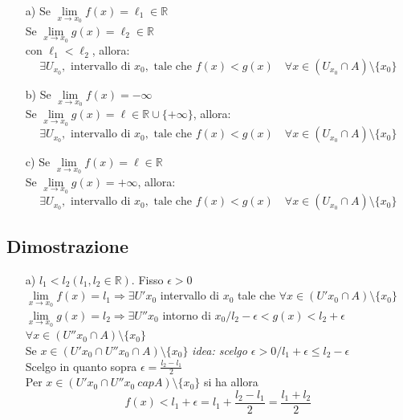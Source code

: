 \documentclass{article}
\newcommand{\R}{\mathbb{R}}
\newcommand{\vSpace}{\vspace{1em}}
\begin{document}
\begin{flushleft}
\begin{enumerate}
    \item[a)] Se \( \lim\limits_{x \to x_0} f(x) = \ell_1 \in \mathbb{R} \) \\
          Se \( \lim\limits_{x \to x_0} g(x) = \ell_2 \in \mathbb{R} \) \\
          con \( \ell_1 < \ell_2 \), allora:
          \[
          \exists U_{x_0}, \text{ intervallo di } x_0, \text{ tale che } f(x) < g(x) \quad \forall x \in (U_{x_0} \cap A) \setminus \{x_0\}
          \]
    
    \item[b)] Se \( \lim\limits_{x \to x_0} f(x) = -\infty \) \\
          Se \( \lim\limits_{x \to x_0} g(x) = \ell \in \mathbb{R} \cup \{+\infty\} \), allora:
          \[
          \exists U_{x_0}, \text{ intervallo di } x_0, \text{ tale che } f(x) < g(x) \quad \forall x \in (U_{x_0} \cap A) \setminus \{x_0\}
          \]

    \item[c)] Se \( \lim\limits_{x \to x_0} f(x) = \ell \in \mathbb{R} \) \\
          Se \( \lim\limits_{x \to x_0} g(x) = +\infty \), allora:
          \[
          \exists U_{x_0}, \text{ intervallo di } x_0, \text{ tale che } f(x) < g(x) \quad \forall x \in (U_{x_0} \cap A) \setminus \{x_0\}
          \]
\end{enumerate}

\subsection{Dimostrazione}
\begin{enumerate}
    \item[a)]
    $l_1 < l_2 (l_1,l_2 \in \R)$. Fisso $\epsilon>0$\\
    $\lim\limits_{x \to x_0} f(x)=l_1 \Rightarrow \exists U' x_0$ intervallo di $x_0$ tale che $\forall x \in (U' x_0 \cap A)\setminus \{x_0\}$
    \\$\lim\limits_{x \to x_0} g(x) = l_2 \Rightarrow \exists U'' x_0$ intorno di $x_0 / l_2 - \epsilon < g(x) < l_2 + \epsilon$ $\forall x \in (U'' x_0 \cap A) \setminus \{x_0\}$
    \vSpace
    \\Se $x \in (U' x_0 \cap U'' x_0 \cap A) \setminus \{x_0\}$ \textit{idea: scelgo $\epsilon>0 / l_1 + \epsilon \leq l_2 - \epsilon$}
    \\Scelgo in quanto sopra $\epsilon = \frac{l_2 - l_1}{2}$
    \\Per $x \in (U' x_0 \cap U'' x_0 \ cap A) \setminus \{x_0\}$ si ha allora 
    \[f(x) < l_1 + \epsilon = l_1 + \frac{l_2 - l_1}{2} = \frac{l_1 + l_2}{2}\]
\end{enumerate}



\end{flushleft}
\end{document}
